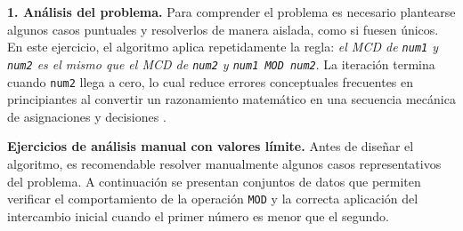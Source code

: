 \documentclass[12pt,twoside]{book}
\begin{document}
						\noindent
						\textbf{1. Análisis del problema.}  
						Para comprender el problema es necesario plantearse algunos casos puntuales y resolverlos de manera aislada, como si fuesen únicos. En este ejercicio, el algoritmo aplica repetidamente la regla: \emph{el MCD de \texttt{num1} y \texttt{num2} es el mismo que el MCD de \texttt{num2} y \texttt{num1 MOD num2}}. La iteración termina cuando \texttt{num2} llega a cero, lo cual reduce errores conceptuales frecuentes en principiantes al convertir un razonamiento matemático en una secuencia mecánica de asignaciones y decisiones \cite{Qian2018Students,Robins2003Learning,Lister2004Learning}.
						
						\noindent
						\textbf{Ejercicios de análisis manual con valores límite.}
						Antes de diseñar el algoritmo, es recomendable resolver manualmente algunos casos representativos del problema. A continuación se presentan conjuntos de datos que permiten verificar el comportamiento de la operación \texttt{MOD} y la correcta aplicación del intercambio inicial cuando el primer número es menor que el segundo.
						
\end{document}
